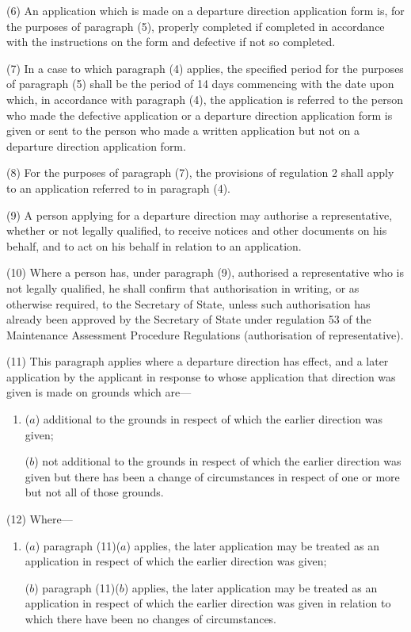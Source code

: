 \documentclass[a4paper]{article}
\begin{document}
(6) An application which is made on a departure direction application form is,
for the purposes of paragraph (5), properly completed if completed in accordance
with the instructions on the form and defective if not so completed.

(7) In a case to which paragraph (4) applies, the specified period for the
purposes of paragraph (5) shall be the period of 14 days commencing with the
date upon which, in accordance with paragraph (4), the application is referred
to the person who made the defective application or a departure direction
application form is given or sent to the person who made a written application
but not on a departure direction application form.

(8) For the purposes of paragraph (7), the provisions of regulation 2 shall
apply to an application referred to in paragraph (4).

(9) A person applying for a departure direction may authorise a representative,
whether or not legally qualified, to receive notices and other documents on his
behalf, and to act on his behalf in relation to an application.

(10) Where a person has, under paragraph (9), authorised a representative who is
not legally qualified, he shall confirm that authorisation in writing, or as
otherwise required, to the Secretary of State, unless such authorisation has
already been approved by the Secretary of State under regulation 53 of the
Maintenance Assessment Procedure Regulations (authorisation of representative).

(11) This paragraph applies where a departure direction has effect, and a later
application by the applicant in response to whose application that direction was
given is made on grounds which are—
\begin{enumerate}\item[]
($a$) additional to the grounds in respect of which the earlier direction was
given;

($b$) not additional to the grounds in respect of which the earlier direction was
given but there has been a change of circumstances in respect of one or more but
not all of those grounds.
\end{enumerate}

(12) Where—
\begin{enumerate}\item[]
($a$) paragraph (11)($a$) applies, the later application may be treated as an
application in respect of which the earlier direction was given;

($b$) paragraph (11)($b$) applies, the later application may be treated as an
application in respect of which the earlier direction was given in relation to
which there have been no changes of circumstances.
\end{enumerate}
\end{document}
